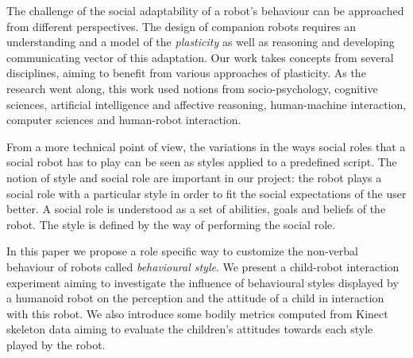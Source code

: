 The challenge of the social adaptability of a robot's behaviour can be approached from different perspectives. 
The design of companion robots requires an understanding and a model of the \emph{plasticity} as well as reasoning and developing communicating vector of this adaptation. 
Our work takes concepts from several disciplines, aiming to benefit from various approaches of plasticity.
As the research went along, this work used notions from socio-psychology, cognitive sciences, artificial intelligence and affective reasoning, human-machine interaction, computer sciences and human-robot interaction.

From a more technical point of view, the variations in the ways social roles that a social robot  has to play can be seen as styles applied to a predefined script.
The notion of style and social role are important in our project: the robot plays a social role with a particular style in order to fit the social expectations of the user better.
A social role is understood as a set of abilities, goals and beliefs of the robot.
The style is defined by the way of performing the social role.



In this paper we propose a role specific way to customize the non-verbal behaviour of robots called \emph{behavioural style}.
We present a child-robot interaction experiment aiming to investigate the influence of behavioural styles displayed by a humanoid robot on the perception and the attitude of a child in interaction with this robot. 
We also introduce some bodily metrics computed from Kinect skeleton data aiming to evaluate the children's attitudes towards each style played by the robot.

